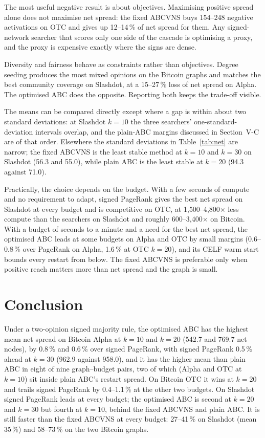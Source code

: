 \documentclass[journal,letterpaper,10pt]{IEEEtran}
\begin{document}
The most useful negative result is about objectives. Maximising positive spread alone does not maximise net spread: the fixed ABCVNS buys 154--248 negative activations on OTC and gives up 12--14\,\% of net spread for them. Any signed-network searcher that scores only one side of the cascade is optimising a proxy, and the proxy is expensive exactly where the signs are dense.

Diversity and fairness behave as constraints rather than objectives. Degree seeding produces the most mixed opinions on the Bitcoin graphs and matches the best community coverage on Slashdot, at a 15--27\,\% loss of net spread on Alpha. The optimised ABC does the opposite. Reporting both keeps the trade-off visible.

The means can be compared directly except where a gap is within about two standard deviations: at Slashdot $k=10$ the three searchers' one-standard-deviation intervals overlap, and the plain-ABC margins discussed in Section~V-C are of that order. Elsewhere the standard deviations in Table~\ref{tab:net} are narrow; the fixed ABCVNS is the least stable method at $k=10$ and $k=30$ on Slashdot (56.3 and 55.0), while plain ABC is the least stable at $k=20$ (94.3 against 71.0).

Practically, the choice depends on the budget. With a few seconds of compute and no requirement to adapt, signed PageRank gives the best net spread on Slashdot at every budget and is competitive on OTC, at 1{,}500--4{,}800$\times$ less compute than the searchers on Slashdot and roughly 600--3{,}400$\times$ on Bitcoin. With a budget of seconds to a minute and a need for the best net spread, the optimised ABC leads at some budgets on Alpha and OTC by small margins (0.6--0.8\,\% over PageRank on Alpha, 1.6\,\% at OTC $k=20$), and its CELF warm start bounds every restart from below. The fixed ABCVNS is preferable only when positive reach matters more than net spread and the graph is small.

\section{Conclusion}

Under a two-opinion signed majority rule, the optimised ABC has the highest mean net spread on Bitcoin Alpha at $k=10$ and $k=20$ (542.7 and 769.7 net nodes), by 0.8\,\% and 0.6\,\% over signed PageRank, with signed PageRank 0.5\,\% ahead at $k=30$ (962.9 against 958.0), and it has the higher mean than plain ABC in eight of nine graph--budget pairs, two of which (Alpha and OTC at $k=10$) sit inside plain ABC's restart spread. On Bitcoin OTC it wins at $k=20$ and trails signed PageRank by 0.4--1.1\,\% at the other two budgets. On Slashdot signed PageRank leads at every budget; the optimised ABC is second at $k=20$ and $k=30$ but fourth at $k=10$, behind the fixed ABCVNS and plain ABC. It is still faster than the fixed ABCVNS at every budget: 27--41\,\% on Slashdot (mean 35\,\%) and 58--73\,\% on the two Bitcoin graphs.
\end{document}

